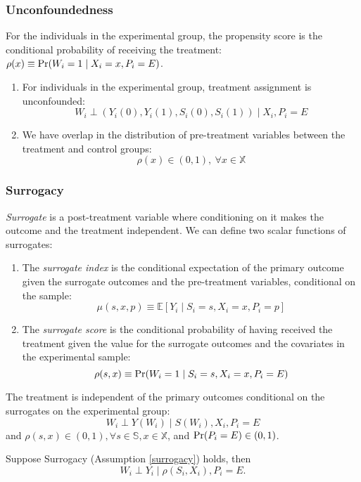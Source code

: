 \subsubsection*{Unconfoundedness}
For the individuals in the experimental group, the propensity score is the conditional probability of receiving the treatment: $\rho(x)\equiv \textnormal{Pr}(W_i=1\mid X_i=x,P_i=E)$.
\begin{assumption}\label{unconfounded}
\begin{enumerate}
    \item For individuals in the experimental group, treatment assignment is unconfounded: $$W_i\perp (Y_i(0), Y_i(1), S_i(0), S_i(1))\mid X_i,P_i=E$$
    \item We have overlap in the distribution of pre-treatment variables between the treatment and control groups: $$\rho(x)\in (0,1),\ \forall x\in \mathbb{X}$$
\end{enumerate}
\end{assumption}

\subsubsection*{Surrogacy}
\textit{Surrogate} is a post-treatment variable where conditioning on it makes the outcome and the treatment independent. We can define two scalar functions of surrogates:
\begin{definition}
    \begin{enumerate}
        \item The \textit{surrogate index} is the conditional expectation of the primary outcome given the surrogate outcomes and the pre-treatment variables, conditional on the sample: $$\mu(s,x,p)\equiv \mathbb{E}[Y_i\mid S_i=s,X_i=x,P_i=p]$$
        \item The \textit{surrogate score} is the conditional probability of having received the treatment given the value for the surrogate outcomes and the covariates in the experimental sample: $$\rho(s,x)\equiv \textnormal{Pr}(W_i=1\mid S_i=s,X_i=x,P_i=E)$$
    \end{enumerate}
\end{definition}
\begin{assumption}[Surrogacy]\label{surrogacy}
    The treatment is independent of the primary outcomes conditional on the surrogates on the experimental group: $$W_i\perp Y(W_i)\mid S(W_i), X_i,P_i=E$$
    and $\rho(s,x)\in(0,1),\forall s\in \mathbb{S},x\in \mathbb{X}$, and $\textnormal{Pr}(P_i=E)\in (0,1)$.
\end{assumption}
\begin{proposition}
    Suppose Surrogacy (Assumption \ref{surrogacy}) holds, then $$W_i\perp Y_i\mid \rho(S_i,X_i), P_i=E.$$
\end{proposition}

